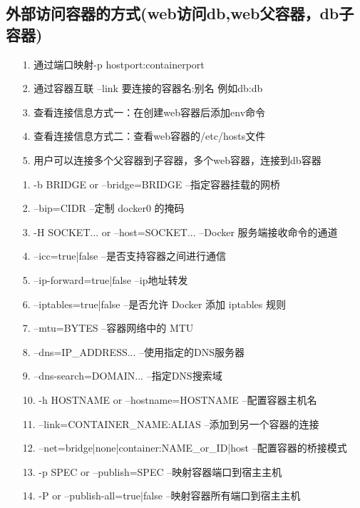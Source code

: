 \documentclass[a4paper,left=1.5cm,right=1.5cm,11pt]{article}
\begin{document}
\tableofcontents

\clearpage

\subsection{外部访问容器的方式(web访问db,web父容器，db子容器)}
\begin{itemize}
	\item[1.]通过端口映射-p hostport:containerport
	\item[2.]通过容器互联 --link 要连接的容器名:别名 例如db:db
	\item[3.]查看连接信息方式一：在创建web容器后添加env命令
	\item[4.]查看连接信息方式二：查看web容器的/etc/hosts文件
	\item[5.]用户可以连接多个父容器到子容器，多个web容器，连接到db容器
\end{itemize}

\begin{itemize}
	\item[1.]-b BRIDGE or --bridge=BRIDGE --指定容器挂载的网桥
	\item[2.]--bip=CIDR --定制 docker0 的掩码
	\item[3.]-H SOCKET... or --host=SOCKET... --Docker 服务端接收命令的通道
	\item[4.]--icc=true|false --是否支持容器之间进行通信
	\item[5.]--ip-forward=true|false --ip地址转发
	\item[6.]--iptables=true|false --是否允许 Docker 添加 iptables 规则
	\item[7.]--mtu=BYTES --容器网络中的 MTU
	\item[8.]--dns=IP_ADDRESS... --使用指定的DNS服务器
	\item[9.]--dns-search=DOMAIN... --指定DNS搜索域
	\item[10.]-h HOSTNAME or --hostname=HOSTNAME --配置容器主机名
	\item[11.]--link=CONTAINER_NAME:ALIAS --添加到另一个容器的连接
	\item[12.]--net=bridge|none|container:NAME_or_ID|host --配置容器的桥接模式
	\item[13.]-p SPEC or --publish=SPEC --映射容器端口到宿主主机
	\item[14.]-P or --publish-all=true|false --映射容器所有端口到宿主主机
\end{itemize}
\end{document}
